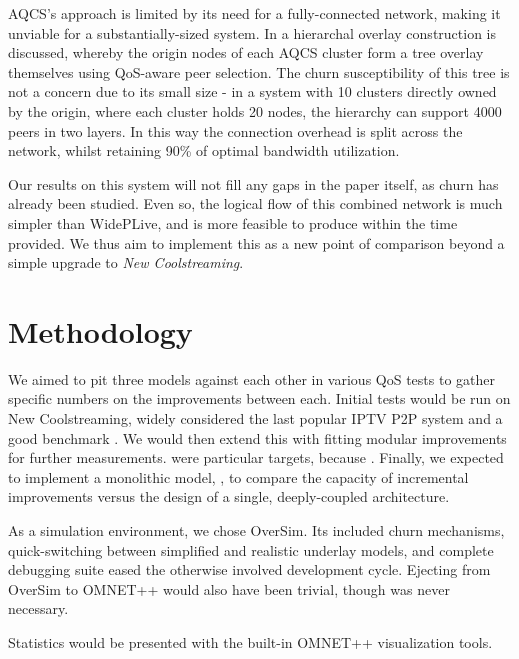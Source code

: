 \documentclass[12pt,a4paper]{article}
\begin{document}
AQCS's approach is limited by its need for a fully-connected network, making it unviable for a substantially-sized system. In \cite{Liang2007} a hierarchal overlay construction is discussed, whereby the origin nodes of each AQCS cluster form a tree overlay themselves using QoS-aware peer selection. The churn susceptibility of this tree is not a concern due to its small size - in a system with 10 clusters directly owned by the origin, where each cluster holds 20 nodes, the hierarchy can support 4000 peers in two layers. In this way the connection overhead is split across the network, whilst retaining 90\% of optimal bandwidth utilization.

Our results on this system will not fill any gaps in the paper itself, as churn has already been studied. Even so, the logical flow of this combined network is much simpler than WidePLive, and is more feasible to produce within the time provided. We thus aim to implement this as a new point of comparison beyond a simple upgrade to \textit{New Coolstreaming}.

\section{Methodology} \label{methodology}
We aimed to pit three models  against each other in various QoS tests  to gather specific numbers on the improvements between each. Initial tests would be run on New Coolstreaming, widely considered the last popular IPTV P2P system and a good benchmark . We would then extend this with fitting modular improvements for further measurements.  were particular targets, because . Finally, we expected to implement a monolithic model, , to compare the capacity of incremental improvements versus the design of a single, deeply-coupled architecture.

As a simulation environment, we chose OverSim. Its included churn mechanisms, quick-switching between simplified and realistic underlay models, and complete debugging suite eased the otherwise involved development cycle. Ejecting from OverSim to OMNET++ would also have been trivial, though was never necessary.

Statistics would be presented with the built-in OMNET++ visualization tools.

\end{document}

